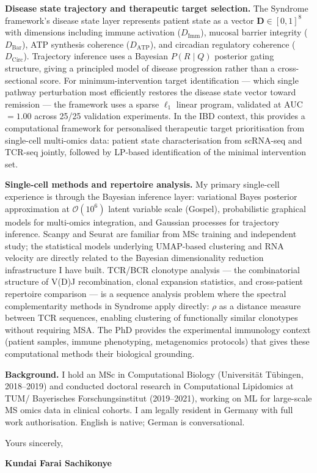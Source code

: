 \documentclass[12pt,a4paper]{article}
\begin{document}
\textbf{Disease state trajectory and therapeutic target selection.}
The Syndrome framework's disease state layer represents patient state as a vector
$\mathbf{D} \in [0,1]^8$ with dimensions including immune activation ($D_\mathrm{Imm}$),
mucosal barrier integrity ($D_\mathrm{Bar}$), ATP synthesis coherence ($D_\mathrm{ATP}$),
and circadian regulatory coherence ($D_\mathrm{Circ}$).
Trajectory inference uses a Bayesian $P(R \mid Q)$ posterior gating structure,
giving a principled model of disease progression rather than a cross-sectional
score.
For minimum-intervention target identification --- which single pathway
perturbation most efficiently restores the disease state vector toward
remission --- the framework uses a sparse $\ell_1$ linear program, validated
at AUC\,$=1.00$ across 25/25 validation experiments.
In the IBD context, this provides a computational framework for
personalised therapeutic target prioritisation from single-cell multi-omics
data: patient state characterisation from scRNA-seq and TCR-seq jointly,
followed by LP-based identification of the minimal intervention set.

\textbf{Single-cell methods and repertoire analysis.}
My primary single-cell experience is through the Bayesian inference layer:
variational Bayes posterior approximation at $\mathcal{O}(10^6)$ latent
variable scale (Gospel), probabilistic graphical models for multi-omics
integration, and Gaussian processes for trajectory inference.
Scanpy and Seurat are familiar from MSc training and independent study;
the statistical models underlying UMAP-based clustering and RNA velocity
are directly related to the Bayesian dimensionality reduction infrastructure
I have built.
TCR/BCR clonotype analysis --- the combinatorial structure of V(D)J recombination,
clonal expansion statistics, and cross-patient repertoire comparison --- is a
sequence analysis problem where the spectral complementarity methods in Syndrome
apply directly: $\rho$ as a distance measure between TCR sequences, enabling
clustering of functionally similar clonotypes without requiring MSA.
The PhD provides the experimental immunology context (patient samples, immune
phenotyping, metagenomics protocols) that gives these computational methods
their biological grounding.

\textbf{Background.}
I hold an MSc in Computational Biology (Universität Tübingen, 2018--2019)
and conducted doctoral research in Computational Lipidomics at TUM\slash
Bayerisches Forschungsinstitut (2019--2021), working on ML for
large-scale MS omics data in clinical cohorts.
I am legally resident in Germany with full work authorisation.
English is native; German is conversational.

\vspace{1.5em}
Yours sincerely,

\vspace{2.5em}
\textbf{Kundai Farai Sachikonye}
\end{document}
